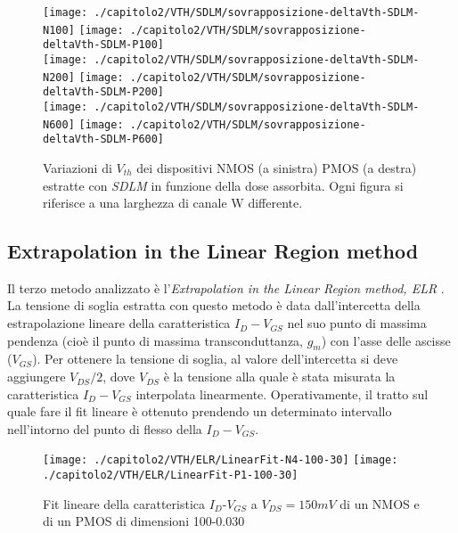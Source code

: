 \clearpage

\begin{figure}[ht]
  \centering
  \texttt{[image: ./capitolo2/VTH/SDLM/sovrapposizione-deltaVth-SDLM-N100]}
  \texttt{[image: ./capitolo2/VTH/SDLM/sovrapposizione-deltaVth-SDLM-P100]}\\
  \vspace{0.2cm}
  \texttt{[image: ./capitolo2/VTH/SDLM/sovrapposizione-deltaVth-SDLM-N200]}
  \texttt{[image: ./capitolo2/VTH/SDLM/sovrapposizione-deltaVth-SDLM-P200]}\\
  \vspace{0.2cm}
  \texttt{[image: ./capitolo2/VTH/SDLM/sovrapposizione-deltaVth-SDLM-N600]}
  \texttt{[image: ./capitolo2/VTH/SDLM/sovrapposizione-deltaVth-SDLM-P600]}
  \caption[Dati $\Delta V_{th}$ estratti con SDLM]{Variazioni di $V_{th}$ dei dispositivi NMOS (a sinistra) PMOS (a destra) estratte con \emph{SDLM} in funzione della dose assorbita. Ogni figura si riferisce a una larghezza di canale W differente.}
  \label{fig:deltaVthSDLM}
\end{figure}

\FloatBarrier

\subsection[ELR]{Extrapolation in the Linear Region method}
Il terzo metodo analizzato è l'\emph{Extrapolation in the Linear Region method, ELR} \cite{art2}. La tensione di soglia estratta con questo metodo è data dall'intercetta della estrapolazione lineare della caratteristica $I_D-V_{GS}$ nel suo punto di massima pendenza (cioè il punto di massima transconduttanza, $g_m$) con l'asse delle ascisse ($V_{GS}$). Per ottenere la tensione di soglia, al valore dell'intercetta si deve aggiungere $V_{DS}/2$, dove $V_{DS}$ è la tensione alla quale è stata misurata la caratteristica $I_D-V_{GS}$ interpolata linearmente.
Operativamente, il tratto sul quale fare il fit lineare è ottenuto prendendo un determinato intervallo nell'intorno del punto di flesso della $I_D-V_{GS}$.

\begin{figure}[h!]
  \centering
  \texttt{[image: ./capitolo2/VTH/ELR/LinearFit-N4-100-30]}
  \texttt{[image: ./capitolo2/VTH/ELR/LinearFit-P1-100-30]}
  \caption[Applicazione ELR]{Fit lineare della caratteristica  $I_D$-$V_{GS}$ a $V_{DS}=150mV$ di un NMOS e di un PMOS di dimensioni 100-0.030 }
\end{figure}

